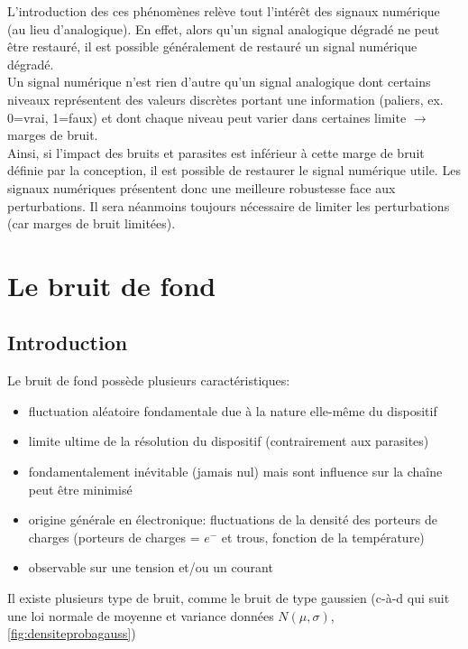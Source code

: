 L'introduction des ces phénomènes relève tout l'intérêt des signaux numérique (au lieu d'analogique). En effet, alors qu'un signal analogique dégradé ne peut être restauré, il est possible généralement de restauré un signal numérique dégradé.\\
Un signal numérique n'est rien d'autre qu'un signal analogique dont certains niveaux représentent des valeurs discrètes portant une information (paliers, ex. 0=vrai, 1=faux) et dont chaque niveau peut varier dans certaines limite \(\rightarrow\) marges de bruit.\\

Ainsi, si l'impact des bruits et parasites est inférieur à cette marge de bruit définie par la conception, il est possible de restaurer le signal numérique utile. Les signaux numériques présentent donc une meilleure robustesse face aux perturbations. Il sera néanmoins toujours nécessaire de limiter les perturbations (car marges de bruit limitées).
\section{Le bruit de fond}
\subsection{Introduction}
Le bruit de fond possède plusieurs caractéristiques:
\begin{itemize}
	\item fluctuation aléatoire fondamentale due à la nature elle-même du dispositif
	\item limite ultime de la résolution du dispositif (contrairement aux parasites)
	\item fondamentalement inévitable (jamais nul) mais sont influence sur la chaîne peut être minimisé
	\item origine générale en électronique: fluctuations de la densité des porteurs de charges (porteurs de charges = \(e^-\) et trous, fonction de la température)
	\item observable sur une tension et/ou un courant
\end{itemize}
Il existe plusieurs type de bruit, comme le bruit de type gaussien (c-à-d qui suit une loi normale de moyenne et variance données \(N(\mu,\sigma)\), \autoref{fig:densiteprobagauss})

